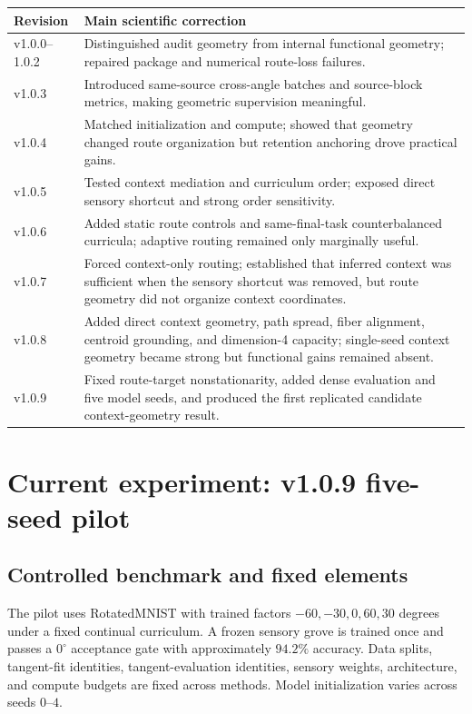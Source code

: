 \documentclass[11pt,a4paper]{article}
\begin{document}
\begin{longtable}{p{}p{}}
\toprule
Revision & Main scientific correction \\
\midrule
v1.0.0--1.0.2 & Distinguished audit geometry from internal functional geometry; repaired package and numerical route-loss failures. \\
v1.0.3 & Introduced same-source cross-angle batches and source-block metrics, making geometric supervision meaningful. \\
v1.0.4 & Matched initialization and compute; showed that geometry changed route organization but retention anchoring drove practical gains. \\
v1.0.5 & Tested context mediation and curriculum order; exposed direct sensory shortcut and strong order sensitivity. \\
v1.0.6 & Added static route controls and same-final-task counterbalanced curricula; adaptive routing remained only marginally useful. \\
v1.0.7 & Forced context-only routing; established that inferred context was sufficient when the sensory shortcut was removed, but route geometry did not organize context coordinates. \\
v1.0.8 & Added direct context geometry, path spread, fiber alignment, centroid grounding, and dimension-4 capacity; single-seed context geometry became strong but functional gains remained absent. \\
v1.0.9 & Fixed route-target nonstationarity, added dense evaluation and five model seeds, and produced the first replicated candidate context-geometry result. \\
\bottomrule
\end{longtable}

\section{Current experiment: v1.0.9 five-seed pilot}

\subsection{Controlled benchmark and fixed elements}

The pilot uses RotatedMNIST with trained factors $-60,-30,0,60,30$ degrees under a fixed continual curriculum. A frozen sensory grove is trained once and passes a $0^{\circ}$ acceptance gate with approximately $94.2\%$ accuracy. Data splits, tangent-fit identities, tangent-evaluation identities, sensory weights, architecture, and compute budgets are fixed across methods. Model initialization varies across seeds $0$--$4$.
\end{document}
